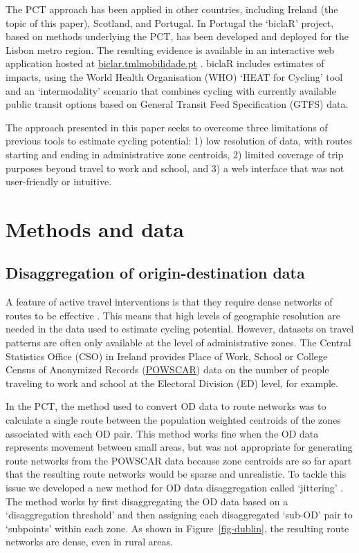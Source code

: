 \documentclass[
  super,
  preprint,
  3p]{elsarticle}
\begin{document}
The PCT approach has been applied in other countries, including Ireland
(the topic of this paper), Scotland, and Portugal. In Portugal the
`biclaR' project, based on methods underlying the PCT, has been
developed and deployed for the Lisbon metro region. The resulting
evidence is available in an interactive web application hosted at
\href{https://biclar.tmlmobilidade.pt}{biclar.tmlmobilidade.pt}
\citep{felix2023}. biclaR includes estimates of impacts, using the World
Health Organisation (WHO) `HEAT for Cycling' tool and an `intermodality'
scenario that combines cycling with currently available public transit
options based on General Transit Feed Specification (GTFS) data.

The approach presented in this paper seeks to overcome three limitations
of previous tools to estimate cycling potential: 1) low resolution of
data, with routes starting and ending in administrative zone centroids,
2) limited coverage of trip purposes beyond travel to work and school,
and 3) a web interface that was not user-friendly or intuitive.

\section{Methods and data}\label{sec-methods}

\subsection{Disaggregation of origin-destination
data}\label{sec-disaggregation}

A feature of active travel interventions is that they require dense
networks of routes to be effective \citep{parkin2018}. This means that
high levels of geographic resolution are needed in the data used to
estimate cycling potential. However, datasets on travel patterns are
often only available at the level of administrative zones. The Central
Statistics Office (CSO) in Ireland provides Place of Work, School or
College Census of Anonymized Records
(\href{https://www.cso.ie/en/census/census2016reports/powscar/}{POWSCAR})
data on the number of people traveling to work and school at the
Electoral Division (ED) level, for example.

In the PCT, the method used to convert OD data to route networks was to
calculate a single route between the population weighted centroids of
the zones associated with each OD pair. This method works fine when the
OD data represents movement between small areas, but was not appropriate
for generating route networks from the POWSCAR data because zone
centroids are so far apart that the resulting route networks would be
sparse and unrealistic. To tackle this issue we developed a new method
for OD data disaggregation called `jittering' \citep{lovelace2022}. The
method works by first disaggregating the OD data based on a
`disaggregation threshold' and then assigning each disaggregated
`sub-OD' pair to `subpoints' within each zone. As shown in
Figure~\ref{fig-dublin}, the resulting route networks are dense, even in
rural areas.
\end{document}

